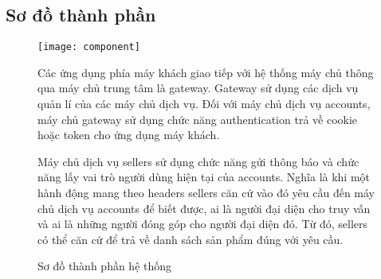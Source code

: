 \subsection{Sơ đồ thành phần}

\begin{figure}[h!]\fontsize{13px}{13px}\selectfont
\centering
		\texttt{[image: component]}
		\caption{Sơ đồ thành phần hệ thống}
\justifying
Các ứng dụng phía máy khách giao tiếp với hệ thống máy chủ thông qua máy chủ trung tâm là gateway. Gateway sử dụng các dịch vụ quản lí của các máy chủ dịch vụ. Đối với máy chủ dịch vụ accounts, máy chủ gateway sử dụng chức năng authentication trả về cookie hoặc token cho ứng dụng máy khách.

Máy chủ dịch vụ sellers sử dụng chức năng gửi thông báo và chức năng lấy vai trò người dùng hiện tại của accounts. Nghĩa là khi một hành động mang theo \acrshort{headers} sellers căn cứ vào đó yêu cầu đến máy chủ dịch vụ accounts để biết được, ai là người đại diện cho truy vấn và ai là những người đóng góp cho người đại diện đó. Từ đó, sellers có thể căn cứ để trả về danh sách sản phẩm đúng với yêu cầu.
\end{figure}